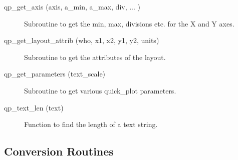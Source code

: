 \begin{description}

\item[qp_get_axis (axis, a_min, a_max, div, ... ) ] \Newline
     Subroutine to get the min, max, divisions etc. for the X and Y axes.

\item[qp_get_layout_attrib (who, x1, x2, y1, y2, units)] \Newline 
     Subroutine to get the attributes of the layout.

\item[qp_get_parameters (text_scale)] \Newline 
Subroutine to get various quick_plot parameters.

\item[qp_text_len (text)] \Newline 
     Function to find the length of a text string.

\end{description}

\subsection{Conversion Routines}


